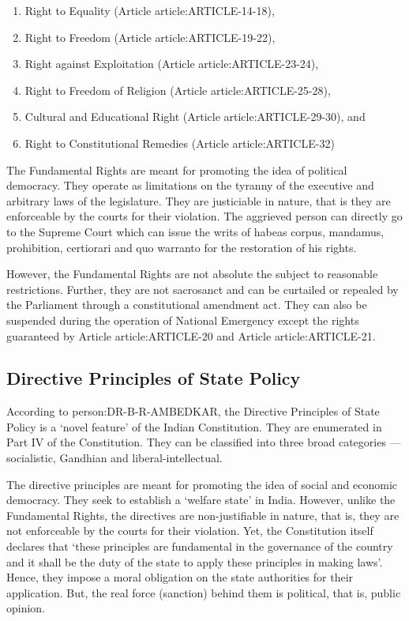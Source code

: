 \begin{multicol}{2}
\renewcommand{\labelenumi}{\textbf{(\alph{enumi})}}
\begin{enumerate}
  \item Right to Equality (Article \gls{article:ARTICLE-14-18}),
  \item Right to Freedom (Article \gls{article:ARTICLE-19-22}),
  \item Right against Exploitation (Article \gls{article:ARTICLE-23-24}),
  \item Right to Freedom of Religion (Article \gls{article:ARTICLE-25-28}),
  \item Cultural and Educational Right (Article \gls{article:ARTICLE-29-30}), and
  \item Right to Constitutional Remedies (Article \gls{article:ARTICLE-32})
\end{enumerate}

The Fundamental Rights are meant for promoting the idea of political democracy. They operate as limitations on the tyranny of the executive and arbitrary laws of the legislature. They are justiciable in nature, that is they are enforceable by the courts for their violation. The aggrieved person can directly go to the Supreme Court which can issue the writs of { habeas corpus}, { mandamus}, prohibition, { certiorari} and { quo warranto} for the restoration of his rights.

However, the Fundamental Rights are not absolute the subject to reasonable restrictions. Further, they are not sacrosanct and can be curtailed or repealed by the Parliament through a constitutional amendment act. They can also be suspended during the operation of National Emergency except the rights guaranteed by Article \gls{article:ARTICLE-20} and Article \gls{article:ARTICLE-21}.

\subsection{Directive Principles of State Policy}

According to \gls{person:DR-B-R-AMBEDKAR}, the Directive Principles of State Policy is a `novel feature' of the Indian Constitution. They are enumerated in Part IV of the Constitution. They can be classified into three broad categories — socialistic, Gandhian and liberal-intellectual.

The directive principles are meant for promoting the idea of social and economic democracy. They seek to establish a `welfare state' in India. However, unlike the Fundamental Rights, the directives are non-justifiable in nature, that is, they are not enforceable by the courts for their violation. Yet, the Constitution itself declares that `these principles are fundamental in the governance of the country and it shall be the duty of the state to apply these principles in making laws'. Hence, they impose a moral obligation on the state authorities for their application. But, the real force (sanction) behind them is political, that is, public opinion.


\end{multicol}
